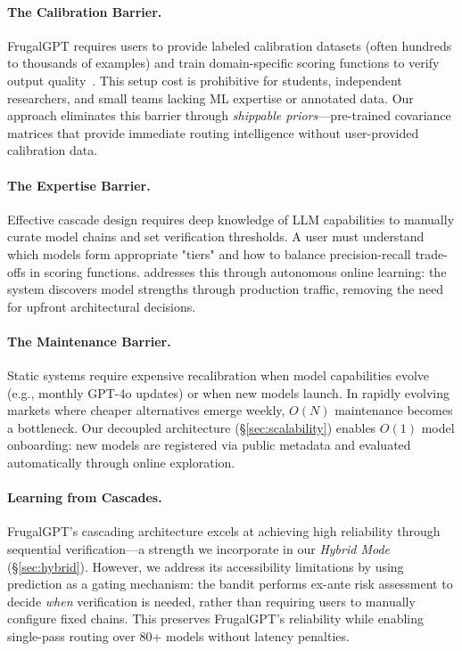 \paragraph{The Calibration Barrier.} FrugalGPT requires users to provide labeled calibration datasets (often hundreds to thousands of examples) and train domain-specific scoring functions to verify output quality~\cite{chen2023frugalgpt}. This setup cost is prohibitive for students, independent researchers, and small teams lacking ML expertise or annotated data. Our approach eliminates this barrier through \emph{shippable priors}---pre-trained covariance matrices that provide immediate routing intelligence without user-provided calibration data.

\paragraph{The Expertise Barrier.} Effective cascade design requires deep knowledge of LLM capabilities to manually curate model chains and set verification thresholds. A user must understand which models form appropriate "tiers" and how to balance precision-recall trade-offs in scoring functions. \ours{} addresses this through autonomous online learning: the system discovers model strengths through production traffic, removing the need for upfront architectural decisions.

\paragraph{The Maintenance Barrier.} Static systems require expensive recalibration when model capabilities evolve (e.g., monthly GPT-4o updates) or when new models launch. In rapidly evolving markets where cheaper alternatives emerge weekly, $O(N)$ maintenance becomes a bottleneck. Our decoupled architecture (\S\ref{sec:scalability}) enables $O(1)$ model onboarding: new models are registered via public metadata and evaluated automatically through online exploration.

\paragraph{Learning from Cascades.} FrugalGPT's cascading architecture excels at achieving high reliability through sequential verification---a strength we incorporate in our \emph{Hybrid Mode} (\S\ref{sec:hybrid}). However, we address its accessibility limitations by using prediction as a gating mechanism: the bandit performs ex-ante risk assessment to decide \emph{when} verification is needed, rather than requiring users to manually configure fixed chains. This preserves FrugalGPT's reliability while enabling single-pass routing over 80+ models without latency penalties.

